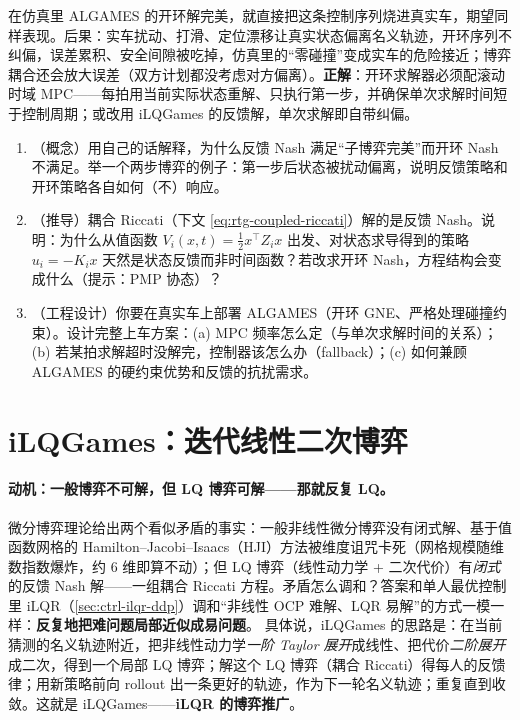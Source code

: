 \begin{pitfall}
在仿真里 ALGAMES 的开环解完美，就直接把这条控制序列烧进真实车，期望同样表现。后果：实车扰动、打滑、定位漂移让真实状态偏离名义轨迹，开环序列不纠偏，误差累积、安全间隙被吃掉，仿真里的“零碰撞”变成实车的危险接近；博弈耦合还会放大误差（双方计划都没考虑对方偏离）。\textbf{正解}：开环求解器必须配滚动时域 MPC——每拍用当前实际状态重解、只执行第一步，并确保单次求解时间短于控制周期；或改用 iLQGames 的反馈解，单次求解即自带纠偏。
\end{pitfall}

\begin{practice}
\begin{enumerate}
  \item （概念）用自己的话解释，为什么反馈 Nash 满足“子博弈完美”而开环 Nash 不满足。举一个两步博弈的例子：第一步后状态被扰动偏离，说明反馈策略和开环策略各自如何（不）响应。
  \item （推导）耦合 Riccati（下文 \cref{eq:rtg-coupled-riccati}）解的是反馈 Nash。说明：为什么从值函数 $V_i(x,t)=\tfrac12 x^\top Z_i x$ 出发、对状态求导得到的策略 $u_i=-K_i x$ 天然是状态反馈而非时间函数？若改求开环 Nash，方程结构会变成什么（提示：PMP 协态）？
  \item （工程设计）你要在真实车上部署 ALGAMES（开环 GNE、严格处理碰撞约束）。设计完整上车方案：(a) MPC 频率怎么定（与单次求解时间的关系）；(b) 若某拍求解超时没解完，控制器该怎么办（fallback）；(c) 如何兼顾 ALGAMES 的硬约束优势和反馈的抗扰需求。
\end{enumerate}
\end{practice}

\section{iLQGames：迭代线性二次博弈}
\label{sec:rtg-ilqgames}

\paragraph{动机：一般博弈不可解，但 LQ 博弈可解——那就反复 LQ。}
微分博弈理论给出两个看似矛盾的事实：一般非线性微分博弈没有闭式解、基于值函数网格的 Hamilton--Jacobi--Isaacs（HJI）方法被维度诅咒卡死（网格规模随维数指数爆炸，约 $6$ 维即算不动）；但 LQ 博弈（线性动力学 + 二次代价）有\emph{闭式}的反馈 Nash 解——一组耦合 Riccati 方程。矛盾怎么调和？答案和单人最优控制里 iLQR（\cref{sec:ctrl-ilqr-ddp}）调和“非线性 OCP 难解、LQR 易解”的方式一模一样：\textbf{反复地把难问题局部近似成易问题}。
具体说，iLQGames 的思路是：在当前猜测的名义轨迹附近，把非线性动力学\emph{一阶 Taylor 展开}成线性、把代价\emph{二阶展开}成二次，得到一个局部 LQ 博弈；解这个 LQ 博弈（耦合 Riccati）得每人的反馈律；用新策略前向 rollout 出一条更好的轨迹，作为下一轮名义轨迹；重复直到收敛。这就是 iLQGames——\textbf{iLQR 的博弈推广}。

